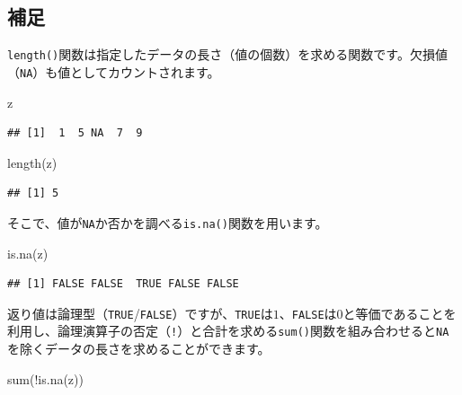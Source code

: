 \documentclass[
  12pt,
]{book}
\newenvironment{Shaded}{\begin{snugshade}}{\end{snugshade}}
\newcommand{\FunctionTok}[1]{\textcolor[rgb]{0.00,0.00,0.00}{#1}}
\newcommand{\NormalTok}[1]{#1}
\newcommand{\SpecialCharTok}[1]{\textcolor[rgb]{0.00,0.00,0.00}{#1}}
\begin{document}
\hypertarget{ux88dcux8db3}{%
\subsection*{補足}\label{ux88dcux8db3}}

\texttt{length()}関数は指定したデータの長さ（値の個数）を求める関数です。欠損値（\texttt{NA}）も値としてカウントされます。

\begin{Shaded}
\begin{Highlighting}[]
\NormalTok{z}
\end{Highlighting}
\end{Shaded}

\begin{verbatim}
## [1]  1  5 NA  7  9
\end{verbatim}

\begin{Shaded}
\begin{Highlighting}[]
\FunctionTok{length}\NormalTok{(z)}
\end{Highlighting}
\end{Shaded}

\begin{verbatim}
## [1] 5
\end{verbatim}

そこで、値が\texttt{NA}か否かを調べる\texttt{is.na()}関数を用います。

\begin{Shaded}
\begin{Highlighting}[]
\FunctionTok{is.na}\NormalTok{(z)}
\end{Highlighting}
\end{Shaded}

\begin{verbatim}
## [1] FALSE FALSE  TRUE FALSE FALSE
\end{verbatim}

返り値は論理型（\texttt{TRUE}/\texttt{FALSE}）ですが、\texttt{TRUE}は\(1\)、\texttt{FALSE}は\(0\)と等価であることを利用し、論理演算子の否定（\texttt{!}）と合計を求める\texttt{sum()}関数を組み合わせると\texttt{NA}を除くデータの長さを求めることができます。

\begin{Shaded}
\begin{Highlighting}[]
\FunctionTok{sum}\NormalTok{(}\SpecialCharTok{!}\FunctionTok{is.na}\NormalTok{(z))}
\end{Highlighting}
\end{Shaded}
\end{document}
